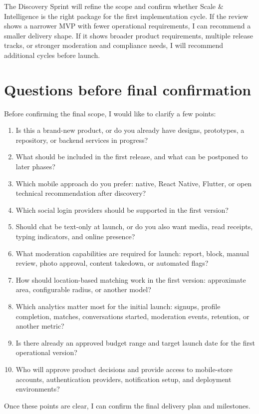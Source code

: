\documentclass[11pt,a4paper]{article}
\begin{document}
The Discovery Sprint will refine the scope and confirm whether Scale \& Intelligence is the right package for the first implementation cycle. If the review shows a narrower MVP with fewer operational requirements, I can recommend a smaller delivery shape. If it shows broader product requirements, multiple release tracks, or stronger moderation and compliance needs, I will recommend additional cycles before launch.\par

\section*{Questions before final confirmation}

Before confirming the final scope, I would like to clarify a few points:\par

\begin{enumerate}
\item Is this a brand-new product, or do you already have designs, prototypes, a repository, or backend services in progress?
\item What should be included in the first release, and what can be postponed to later phases?
\item Which mobile approach do you prefer: native, React Native, Flutter, or open technical recommendation after discovery?
\item Which social login providers should be supported in the first version?
\item Should chat be text-only at launch, or do you also want media, read receipts, typing indicators, and online presence?
\item What moderation capabilities are required for launch: report, block, manual review, photo approval, content takedown, or automated flags?
\item How should location-based matching work in the first version: approximate area, configurable radius, or another model?
\item Which analytics matter most for the initial launch: signups, profile completion, matches, conversations started, moderation events, retention, or another metric?
\item Is there already an approved budget range and target launch date for the first operational version?
\item Who will approve product decisions and provide access to mobile-store accounts, authentication providers, notification setup, and deployment environments?
\end{enumerate}

Once these points are clear, I can confirm the final delivery plan and milestones.\par
\end{document}
